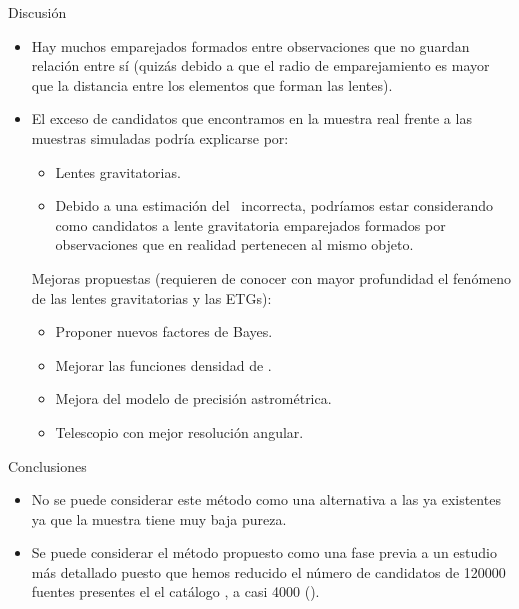 \documentclass[8pt]{beamer}
\begin{document}
\begin{frame}{Discusión}

\begin{itemize}
    \item Hay muchos emparejados formados entre observaciones que no guardan relación entre sí (quizás debido a que el radio de emparejamiento es mayor que la distancia entre los elementos que forman las lentes).
    \item El exceso de candidatos que encontramos en la muestra real frente a las muestras simuladas podría explicarse por:
    \begin{itemize}
        \item Lentes gravitatorias.
        \item Debido a una estimación del \rt\ incorrecta, podríamos estar considerando como candidatos a lente gravitatoria emparejados formados por observaciones que en realidad pertenecen al mismo objeto.
    \end{itemize}
    Mejoras propuestas (requieren de conocer con mayor profundidad el fenómeno de las lentes gravitatorias y las ETGs):
    \begin{itemize}
        \item Proponer nuevos factores de Bayes.
        \item Mejorar las funciones densidad de .
        \item Mejora del modelo de precisión astrométrica.
        \item Telescopio con mejor resolución angular.
    \end{itemize}
\end{itemize}

\end{frame}


\begin{frame}{Conclusiones}
\begin{itemize}
    \item No se puede considerar este método como una alternativa  a las ya existentes ya que la muestra tiene muy baja pureza.
    
    \item Se puede considerar el método propuesto como una fase previa a un estudio más detallado puesto que hemos reducido el número de candidatos de 120000 fuentes presentes el el catálogo \hatlas, a casi 4000 ().
    
\end{itemize}

\end{frame}
\end{document}
